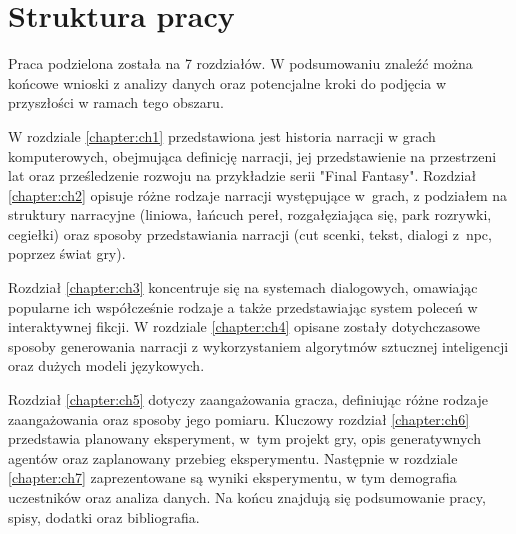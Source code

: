 \section*{Struktura pracy}

Praca podzielona została na 7 rozdziałów. W podsumowaniu znaleźć można końcowe wnioski z analizy danych oraz
potencjalne kroki do podjęcia w przyszłości w ramach tego obszaru.

W rozdziale \ref{chapter:ch1} przedstawiona jest historia narracji w grach komputerowych, obejmująca definicję narracji, jej
przedstawienie na przestrzeni lat oraz prześledzenie rozwoju na przykładzie serii "Final Fantasy". Rozdział \ref{chapter:ch2}
opisuje różne rodzaje narracji występujące w~grach, z podziałem na struktury narracyjne (liniowa, łańcuch pereł,
rozgałęziająca się, park rozrywki, cegiełki) oraz sposoby przedstawiania narracji (cut scenki, tekst, dialogi
z~\gls{npc}, poprzez świat gry).

Rozdział \ref{chapter:ch3} koncentruje się na systemach dialogowych, omawiając popularne ich współcześnie rodzaje a także
przedstawiając system poleceń w interaktywnej fikcji. W rozdziale \ref{chapter:ch4} opisane zostały dotychczasowe sposoby
generowania narracji z wykorzystaniem algorytmów sztucznej inteligencji oraz dużych modeli językowych.

Rozdział \ref{chapter:ch5} dotyczy zaangażowania gracza, definiując różne rodzaje zaangażowania oraz sposoby jego pomiaru. Kluczowy
rozdział \ref{chapter:ch6} przedstawia planowany eksperyment, w~tym projekt gry, opis generatywnych agentów oraz zaplanowany
przebieg eksperymentu. Następnie w rozdziale \ref{chapter:ch7} zaprezentowane są wyniki eksperymentu, w tym demografia uczestników
oraz analiza danych. Na końcu znajdują się podsumowanie pracy, spisy, dodatki oraz bibliografia.